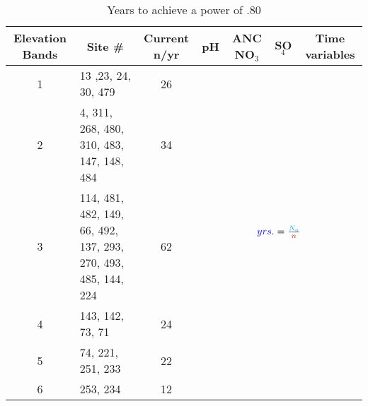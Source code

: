 \begin{table}\scriptsize
\caption{Years to achieve a power of .80}
\begin{tabular}{clccccc}
\toprule
\multicolumn{1}{p{.5cm}}{Elevation Bands} & \multicolumn{1}{c}{Site \#} & \multicolumn{1}{p{.5cm}}{Current n/yr} & \multicolumn{1}{p{.5cm}}{pH} &\multicolumn{1}{p{.5cm}}{ ANC NO$_3$} & SO$_4$ & \multirow{2}{.8cm}{Time variables} \\  
\midrule
1 & 13 ,23, 24, 30, 479 & 26 &\multicolumn{4}{c}{\multirow{6}{*}{\huge$\textcolor{blue}{yrs.} = {\textcolor{cyan}{N_a} \over \textcolor{red}{n}}$}}  \\ 
2 & \multicolumn{1}{p{4cm}}{4, 311, 268, 480, 310, 483, 147, 148, 484} &34 &\multicolumn{4}{c}{} \\ 
3 & \multicolumn{ 1}{p{4cm}}{114, 481, 482, 149, 66, 492, 137, 293, 270, 493, 485, 144, 224} & 62&\multicolumn{4}{c}{}   \\ 
4 & 143, 142, 73, 71 &24 &\multicolumn{4}{c}{}  \\ 
5 & 74, 221, 251, 233 & 22 &\multicolumn{4}{c}{}   \\ 
6 & 253, 234 & 12 &\multicolumn{4}{c}{}  \\  
\bottomrule
\end{tabular}
\end{table}